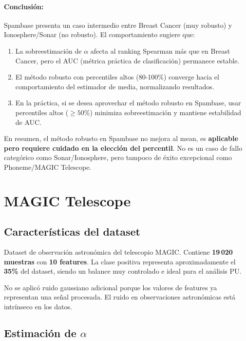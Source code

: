 \documentclass[a4paper,11pt]{article}
\begin{document}
\paragraph{Conclusión:} Spambase presenta un caso intermedio entre Breast Cancer (muy robusto) y Ionosphere/Sonar (no robusto). El comportamiento sugiere que:

\begin{enumerate}
    \item La sobreestimación de $\alpha$ afecta al ranking Spearman más que en Breast Cancer, pero el AUC (métrica práctica de clasificación) permanece estable.
    \item El método robusto con percentiles altos (80-100\%) converge hacia el comportamiento del estimador de media, normalizando resultados.
    \item En la práctica, si se desea aprovechar el método robusto en Spambase, usar percentiles altos ($\geq 50\%$) minimiza sobreestimación y mantiene estabilidad de AUC.
\end{enumerate}

En resumen, el método robusto en Spambase no mejora al mean, es \textbf{aplicable pero requiere cuidado en la elección del percentil}. No es un caso de fallo categórico como Sonar/Ionosphere, pero tampoco de éxito excepcional como Phoneme/MAGIC Telescope.

\section{MAGIC Telescope}

\subsection{Características del dataset}

Dataset de observación astronómica del telescopio MAGIC. Contiene \textbf{19\,020 muestras} con \textbf{10 features}. La clase positiva representa aproximadamente el \textbf{35\%} del dataset, siendo un balance muy controlado e ideal para el análisis PU.

No se aplicó ruido gaussiano adicional porque los valores de features ya representan una señal procesada. El ruido en observaciones astronómicas está intrínseco en los datos.

\subsection{Estimación de $\alpha$}
\end{document}
